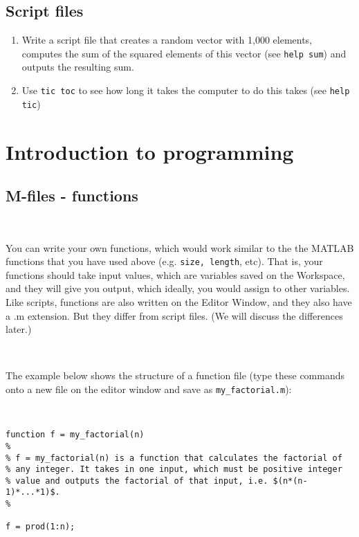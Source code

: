 \documentclass[11pt]{amsart}
\begin{document}
\subsection{Script files}
\begin{enumerate}
\item Write a script file that creates a random vector with 1,000 elements, computes the sum of the squared elements of this vector (see \verb+help sum+) and outputs the resulting sum.
\item Use \verb+tic toc+ to see how long it takes the computer to do this takes (see \verb+help tic+)
\end{enumerate}





\clearpage
\section{Introduction to programming}

\subsection{M-files - functions}

\

You can write your own functions, which would work similar to the the MATLAB functions that you have used above (e.g. \verb+size, length+, etc). That is, your functions should  take input values, which are variables saved on the Workspace, and they will give you output, which ideally, you would assign to other variables. Like scripts, functions are also written on the Editor Window, and they also have a .m extension. But they differ from script files. (We will discuss the differences later.)

\

The example below shows the structure of a function file (type these commands onto a new file on the editor window and save as \verb+my_factorial.m+):


\

\color{blue}
\begin{verbatim}        
function f = my_factorial(n)
%
% f = my_factorial(n) is a function that calculates the factorial of 
% any integer. It takes in one input, which must be positive integer 
% value and outputs the factorial of that input, i.e. $(n*(n-1)*...*1)$.
%
 
f = prod(1:n);
\end{verbatim}
\color{black}
\end{document}
